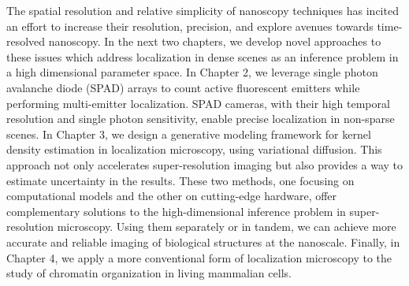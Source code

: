 The spatial resolution and relative simplicity of nanoscopy techniques has incited an effort to increase their resolution, precision, and explore avenues towards time-resolved nanoscopy. In the next two chapters, we develop novel approaches to these issues which address localization in dense scenes as an inference problem in a high dimensional parameter space. In Chapter 2,  we leverage single photon avalanche diode (SPAD) arrays to count active fluorescent emitters while performing multi-emitter localization. SPAD cameras, with their high temporal resolution and single photon sensitivity, enable precise localization in non-sparse scenes. In Chapter 3, we design a generative modeling framework for kernel density estimation in localization microscopy, using variational diffusion. This approach not only accelerates super-resolution imaging but also provides a way to estimate uncertainty in the results. These two methods, one focusing on computational models and the other on cutting-edge hardware, offer complementary solutions to the high-dimensional inference problem in super-resolution microscopy. Using them separately or in tandem, we can achieve more accurate and reliable imaging of biological structures at the nanoscale. Finally, in Chapter 4, we apply a more conventional form of localization microscopy to the study of chromatin organization in living mammalian cells. 

